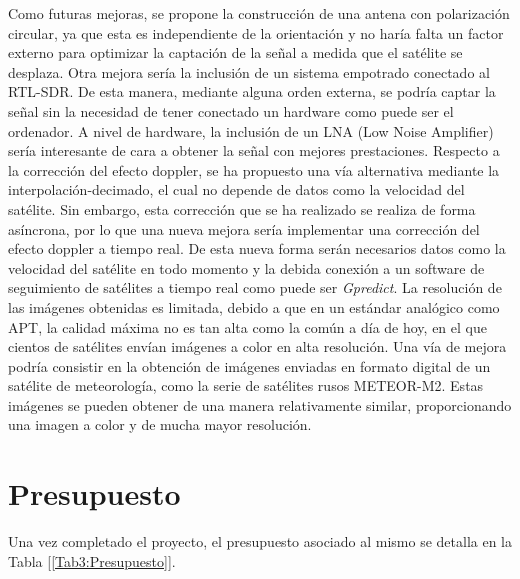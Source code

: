 \documentclass[a4paper,openright,12pt]{article}
\begin{document}
Como futuras mejoras, se propone la construcción de una antena con polarización circular, ya que esta es independiente de la orientación y no haría falta un factor externo para optimizar la captación de la señal a medida que el satélite se desplaza. 
Otra mejora sería la inclusión de un sistema empotrado conectado al RTL-SDR. De esta manera, mediante alguna orden externa, se podría captar la señal sin la necesidad de tener conectado un hardware como puede ser el ordenador. A nivel de hardware, la inclusión de un LNA (Low Noise Amplifier) sería interesante de cara a obtener la señal con mejores prestaciones.
Respecto a la corrección del efecto doppler, se ha propuesto una vía alternativa mediante la interpolación-decimado, el cual no depende de datos como la velocidad del satélite. Sin embargo, esta corrección que se ha realizado se realiza de forma asíncrona, por lo que una nueva mejora sería implementar una corrección del efecto doppler a tiempo real. De esta nueva forma serán necesarios datos como la velocidad del satélite en todo momento y la debida conexión a un software de seguimiento de satélites a tiempo real como puede ser \textit{Gpredict}.
La resolución de las imágenes obtenidas es limitada, debido a que en un estándar analógico como APT, la calidad máxima no es tan alta como la común a día de hoy, en el que cientos de satélites envían imágenes a color en alta resolución. Una vía de mejora podría consistir en la obtención de imágenes enviadas en formato digital de un satélite de meteorología, como la serie de satélites rusos METEOR-M2. Estas imágenes se pueden obtener de una manera relativamente similar, proporcionando una imagen a color y de mucha mayor resolución.

\newpage

\section{Presupuesto}
Una vez completado el proyecto, el presupuesto asociado al mismo se detalla en la Tabla [\ref{Tab3:Presupuesto}].
\end{document}

